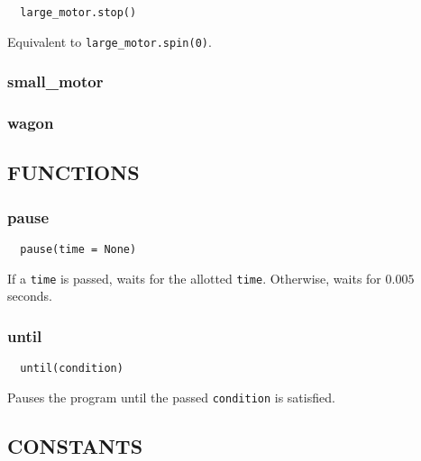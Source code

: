 \documentclass[12pt]{scrartcl} %
\begin{document}
\begin{verbatim}
  large_motor.stop()
\end{verbatim}

Equivalent to \texttt{large_motor.spin(0)}.

\subsubsection{small\_motor}

\subsubsection{wagon}

\subsection{FUNCTIONS}

\subsubsection{pause}

\begin{verbatim}
  pause(time = None)
\end{verbatim}

If a \texttt{time} is passed, waits for the allotted
\texttt{time}. Otherwise, waits for $0.005$ seconds.

\subsubsection{until}

\begin{verbatim}
  until(condition)
\end{verbatim}

Pauses the program until the passed \texttt{condition} is
satisfied.

\subsection{CONSTANTS}
\end{document}
